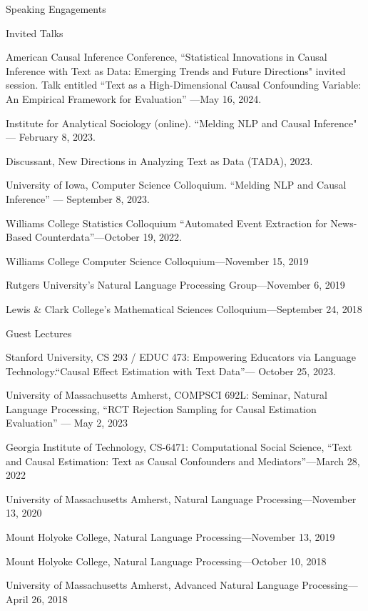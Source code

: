 \documentclass{resume} %
\begin{document}
\begin{rSection}{Speaking Engagements}

\begin{rSubsection}{Invited Talks}{}{}{}
\item American Causal Inference Conference, ``Statistical Innovations in Causal Inference with Text as Data: Emerging Trends and Future Directions" invited session. Talk entitled ``Text as a High-Dimensional Causal Confounding Variable: An Empirical Framework for Evaluation'' ---May 16, 2024.
\item Institute for Analytical Sociology (online). ``Melding NLP and Causal Inference" --- February 8, 2023. 
\item Discussant, New Directions in Analyzing Text as Data (TADA), 2023.
\item University of Iowa, Computer Science Colloquium. ``Melding NLP and Causal Inference'' --- September 8, 2023. 
\item Williams College Statistics Colloquium ``Automated Event Extraction for
News-Based Counterdata''---October 19, 2022.
\item Williams College Computer Science Colloquium---November 15, 2019
\item Rutgers University's Natural Language Processing Group---November 6, 2019
\item Lewis \& Clark College's Mathematical Sciences Colloquium---September 24, 2018
\end{rSubsection}

\begin{rSubsection}{Guest Lectures}{}{}{}
\item Stanford University, CS 293 / EDUC 473: Empowering Educators via Language Technology.``Causal Effect Estimation with Text Data''--- October 25, 2023. 
\item University of Massachusetts Amherst, COMPSCI 692L: Seminar, Natural Language Processing, ``RCT Rejection Sampling for Causal Estimation Evaluation'' --- May 2, 2023
\item Georgia Institute of Technology, CS-6471: Computational Social Science, ``Text and Causal Estimation: Text as Causal Confounders and Mediators''---March 28, 2022
\item University of Massachusetts Amherst, Natural Language Processing---November 13, 2020 
\item Mount Holyoke College, Natural Language Processing---November 13, 2019
\item Mount Holyoke College, Natural Language Processing---October 10, 2018
\item University of Massachusetts Amherst, Advanced Natural Language Processing---April 26, 2018
\end{rSubsection}

\end{rSection}
\end{document}

